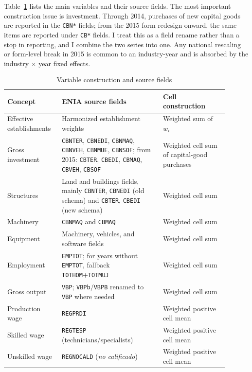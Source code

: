 \documentclass[12pt]{article}
\begin{document}
Table~\ref{tab:varconstruction} lists the main variables and their source fields. The most important
construction issue is investment. Through 2014, purchases of new capital goods are reported in the
\texttt{CBN*} fields; from the 2015 form redesign onward, the same items are reported under \texttt{CB*}
fields. I treat this as a field rename rather than a stop in reporting, and I combine the two series into
one. Any national rescaling or form-level break in 2015 is common to an industry-year and is absorbed by
the industry $\times$ year fixed effects.

\begin{table}[htbp]\centering
\caption{Variable construction and source fields}
\label{tab:varconstruction}
\begin{threeparttable}
\small\setlength{\tabcolsep}{4pt}
\begin{tabular}{p{0.21\linewidth}p{0.42\linewidth}p{0.27\linewidth}}
\toprule
Concept & ENIA source fields & Cell construction \\
\midrule
Effective establishments & Harmonized establishment weights & Weighted sum of $w_i$ \\
Gross investment & \texttt{CBNTER}, \texttt{CBNEDI}, \texttt{CBNMAQ}, \texttt{CBNVEH},
\texttt{CBNMUE}, \texttt{CBNSOF}; from 2015: \texttt{CBTER}, \texttt{CBEDI}, \texttt{CBMAQ},
\texttt{CBVEH}, \texttt{CBSOF} & Weighted cell sum of capital-good purchases \\
Structures & Land and buildings fields, mainly \texttt{CBNTER}, \texttt{CBNEDI} (old schema) and
\texttt{CBTER}, \texttt{CBEDI} (new schema) & Weighted cell sum \\
Machinery & \texttt{CBNMAQ} and \texttt{CBMAQ} & Weighted cell sum \\
Equipment & Machinery, vehicles, and software fields & Weighted cell sum \\
Employment & \texttt{EMPTOT}; for years without \texttt{EMPTOT}, fallback
\texttt{TOTHOM}+\texttt{TOTMUJ} & Weighted cell sum \\
Gross output & \texttt{VBP}; \texttt{VBPb}/\texttt{VBPB} renamed to \texttt{VBP} where needed &
Weighted cell sum \\
Production wage & \texttt{REGPRDI} & Weighted positive cell mean \\
Skilled wage & \texttt{REGTESP} (technicians/specialists) & Weighted positive cell mean \\
Unskilled wage & \texttt{REGNOCALD} (\emph{no calificado}) & Weighted positive cell mean \\

\end{tabular}
\end{threeparttable}
\end{table}
\end{document}
